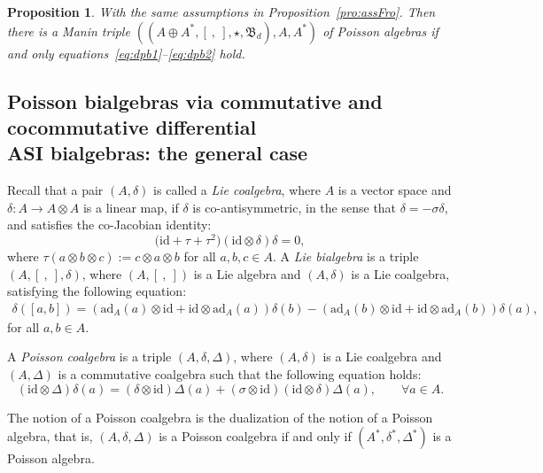 \documentclass[pdftex]{sigma}
\numberwithin{equation}{section}
\newtheorem{Proposition}[Theorem]{Proposition}
{ \theoremstyle{definition}
	\newtheorem{Definition}[Theorem]{Definition}
	\newtheorem{Note}[Theorem]{Note}
	\newtheorem{Example}[Theorem]{Example}
	\newtheorem{Remark}[Theorem]{Remark} }
\newcommand{\ad}{\mathrm{ad}}
\newcommand{\id}{\mathrm{id}}
\begin{document}
\begin{Proposition}\label{pro:gmtf}
 With the same assumptions in Proposition~{\rm \ref{pro:assFro}}.
 Then there is a Manin triple $((A \oplus A^*,[\ ,\ ], \star, \mathfrak{B}_d), A, A^*)$ of Poisson algebras if and only equations~\eqref{eq:dpb1}--\eqref{eq:dpb2} hold.
\end{Proposition}

\subsection[Poisson bialgebras via commutative and cocommutative differential ASI bialgebras: the general case]{Poisson bialgebras via commutative and cocommutative differential\\ ASI bialgebras: the general case}

Recall that a pair $(A, \delta)$ is called a \textit{Lie
coalgebra}, where $A$ is a vector space and $\delta\colon A \to A
\otimes A$ is a linear map, if $\delta$ is
co-antisymmetric, in the sense that $\delta = -\sigma \delta$, and
satisfies the co-Jacobian identity:
\begin{equation*}
 \big(\id + \tau + \tau^2\big)(\id \otimes \delta)\delta = 0,
\end{equation*}
where $\tau(a \otimes b \otimes c):= c \otimes a \otimes b$ for all $a, b, c \in A$.
A \textit{Lie bialgebra} is a triple $(A, [\ ,\ ], \delta)$,
where $(A, [\ ,\ ])$ is a Lie algebra and $(A, \delta)$ is a Lie coalgebra,
satisfying the following equation:
\begin{gather}
 \delta([a, b]) = (\ad_A(a) \otimes \id + \id \otimes \ad_A (a) )\delta(b) - (\ad_A (b) \otimes \id + \id \otimes \ad_A (b) )\delta(a),
\label{eq:lie_bi}
\end{gather}
for all $a, b \in A$.

\begin{Definition}
 A \textit{Poisson coalgebra} is a triple $(A, \delta, \Delta)$,
 where $(A, \delta)$ is a Lie coalgebra and $(A, \Delta)$ is a commutative coalgebra
 such that the following equation holds:
 \begin{equation*}
 (\id \otimes \Delta)\delta(a) = (\delta \otimes \id)\Delta(a) + (\sigma \otimes \id)(\id \otimes \delta)\Delta(a), \qquad \forall a \in A. %
 \end{equation*}
\end{Definition}
\begin{Remark}
 The notion of a Poisson coalgebra is the dualization of the notion of a Poisson algebra, that is, $(A, \delta, \Delta)$ is a Poisson coalgebra if and only if $(A^*, \delta^*, \Delta^*)$ is a Poisson algebra.
\end{Remark}
\end{document}
